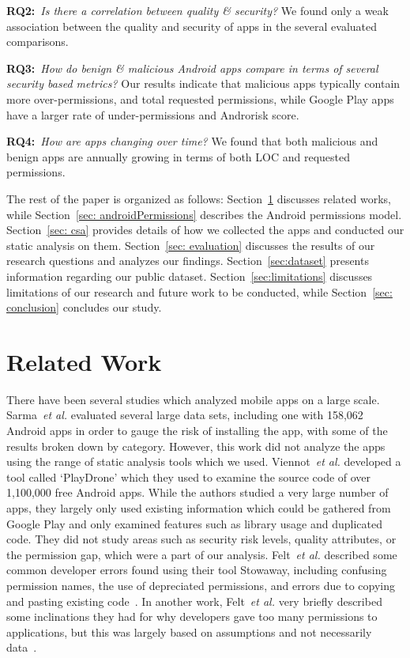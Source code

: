 \documentclass{sig-alternate-05-2015}
\newcommand{\dan}[1]{\textcolor{blue}{{\it [Dan says: #1]}}}
\begin{document}
\noindent
\textbf{RQ2:}~\emph{Is there a correlation between quality \& security?} We found only a weak association between the quality and security of apps in the several evaluated comparisons.

\noindent
\textbf{RQ3:}~\emph{How do benign \& malicious Android apps compare in terms of several security based metrics?} Our results indicate that malicious apps typically contain more over-permissions, and total requested permissions, while Google Play apps have a larger rate of under-permissions and Androrisk score.

\noindent
\textbf{RQ4:}~\emph{How are apps changing over time?} We found that both malicious and benign apps are annually growing in terms of both LOC and requested permissions.

The rest of the paper is organized as follows: Section~\ref{sec: relatedwork} discusses related works, while Section~\ref{sec: androidPermissions} describes the Android permissions model. Section~\ref{sec: csa} provides details of how we collected the apps and conducted our static analysis on them. Section~\ref{sec: evaluation} discusses the results of our research questions and analyzes our findings. Section~\ref{sec:dataset} presents information regarding our public dataset. Section~\ref{sec:limitations} discusses limitations of our research and future work to be conducted, while Section~\ref{sec: conclusion} concludes our study.

\section{Related Work}
\label{sec: relatedwork}

There have been several studies which analyzed mobile apps on a large scale. Sarma~\emph{et al.} evaluated several large data sets, including one with 158,062 Android apps in order to gauge the risk of installing the app, with some of the results broken down by category. However, this work did not analyze the apps using the range of static analysis tools which we used. Viennot~\emph{et al.} developed a tool called `PlayDrone' which they used to examine the source code of over 1,100,000 free Android apps. While the authors studied a very large number of apps, they largely only used existing information which could be gathered from Google Play and only examined features such as library usage and duplicated code. They did not study areas such as security risk levels, quality attributes, or the permission gap, which were a part of our analysis. Felt~\emph{et al.} described some common developer errors found using their tool Stowaway, including confusing permission names, the use of depreciated permissions, and errors due to copying and pasting existing code~\cite{Felt:2011:APD:2046707.2046779}. In another work, Felt~\emph{et al.} very briefly described some inclinations they had for why developers gave too many permissions to applications, but this was largely based on assumptions and not necessarily data~\cite{Felt:2011:EAP:2002168.2002175}.
\end{document}
